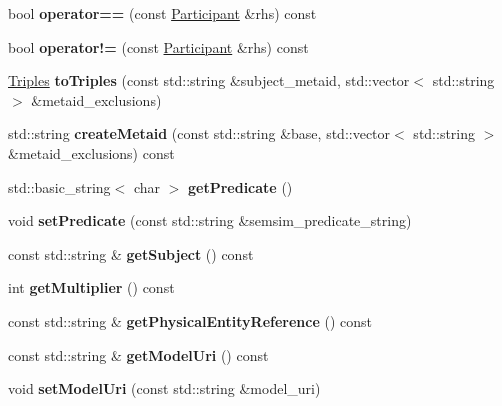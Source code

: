 \begin{DoxyCompactItemize}
\item 
\mbox{\label{classomexmeta_1_1Participant_ad3db317039b403fdb7728885152cbeda}} 
bool {\bfseries operator==} (const \hyperlink{classomexmeta_1_1Participant}{Participant} \&rhs) const
\item 
\mbox{\label{classomexmeta_1_1Participant_aa4baa62cb4ccffe8443262382490328d}} 
bool {\bfseries operator!=} (const \hyperlink{classomexmeta_1_1Participant}{Participant} \&rhs) const
\item 
\mbox{\label{classomexmeta_1_1Participant_a6757eea8a56972eb369e0e102ae5bfc8}} 
\hyperlink{classomexmeta_1_1Triples}{Triples} {\bfseries to\+Triples} (const std\+::string \&subject\+\_\+metaid, std\+::vector$<$ std\+::string $>$ \&metaid\+\_\+exclusions)
\item 
\mbox{\label{classomexmeta_1_1Participant_a03a1ffc7e9efaed5c0e94a62f7c72650}} 
std\+::string {\bfseries create\+Metaid} (const std\+::string \&base, std\+::vector$<$ std\+::string $>$ \&metaid\+\_\+exclusions) const
\item 
\mbox{\label{classomexmeta_1_1Participant_aa09f8c5736dd172b03d7898519d9478d}} 
std\+::basic\+\_\+string$<$ char $>$ {\bfseries get\+Predicate} ()
\item 
\mbox{\label{classomexmeta_1_1Participant_a1188d6a2036514eb6b649ce1e08eca4d}} 
void {\bfseries set\+Predicate} (const std\+::string \&semsim\+\_\+predicate\+\_\+string)
\item 
\mbox{\label{classomexmeta_1_1Participant_a232d2e7fe124ee13650d666fdfc3b866}} 
const std\+::string \& {\bfseries get\+Subject} () const
\item 
\mbox{\label{classomexmeta_1_1Participant_ac7121064734a05141a57f39dce10e71a}} 
int {\bfseries get\+Multiplier} () const
\item 
\mbox{\label{classomexmeta_1_1Participant_a40a5858db6aaae7ec7095b320de838d1}} 
const std\+::string \& {\bfseries get\+Physical\+Entity\+Reference} () const
\item 
\mbox{\label{classomexmeta_1_1Participant_ae78613f8d39ccfc23fc3624deb960fb0}} 
const std\+::string \& {\bfseries get\+Model\+Uri} () const
\item 
\mbox{\label{classomexmeta_1_1Participant_abea74e8605f7314a51db8dc723961462}} 
void {\bfseries set\+Model\+Uri} (const std\+::string \&model\+\_\+uri)
\end{DoxyCompactItemize}


